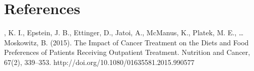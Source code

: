 \documentclass{recipecard}
\begin{document}

\section{References}

, K. I., Epstein, J. B., Ettinger, D., Jatoi, A., McManus, K., Platek, M. E., … Moskowitz, B. (2015). 
\newblock The Impact of Cancer Treatment on the Diets and Food Preferences of Patients Receiving Outpatient Treatment. 
\newblock Nutrition and Cancer, 67(2), 339–353. http://doi.org/10.1080/01635581.2015.990577
\end{document}
